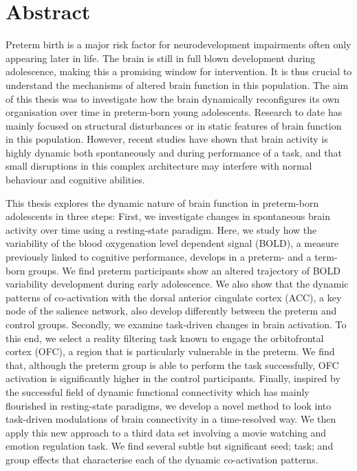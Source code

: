 

\cleardoublepage
\chapter*{Abstract}





Preterm birth is a major risk factor for neurodevelopment impairments often only appearing later in life. The brain is still in full blown development during adolescence, making this a promising window for intervention. It is thus crucial to understand the mechanisms of altered brain function in this population. The aim of this thesis was to investigate how the brain dynamically reconfigures its own organisation over time in preterm-born young adolescents. Research to date has mainly focused on structural disturbances or in static features of brain function in this population. However, recent studies have shown that brain activity is highly dynamic both spontaneously and during performance of a task, and that small disruptions in this complex architecture may interfere with normal behaviour and cognitive abilities.   


\hspace{1cm} This thesis explores the dynamic nature of brain function in preterm-born adolescents in three steps: First, we investigate changes in spontaneous brain activity over time using a resting-state paradigm. Here, we study how the variability of the blood oxygenation level dependent signal (BOLD), a measure previously linked to cognitive performance, develops in a preterm- and a term-born groups. We find preterm participants show an altered trajectory of BOLD variability development during early adolescence. We also show that the dynamic patterns of co-activation with the dorsal anterior cingulate cortex (ACC), a key node of the salience network, also develop differently between the preterm and control groups. Secondly, we examine task-driven changes in brain activation. To this end, we select a reality filtering task known to engage the orbitofrontal cortex (OFC), a region that is particularly vulnerable in the preterm. We find that, although the preterm group is able to perform the task successfully, OFC activation is significantly higher in the control participants. Finally, inspired by the successful field of dynamic functional connectivity which has mainly flourished in resting-state paradigms, we develop a novel method to look into task-driven modulations of brain connectivity in a time-resolved way. We then apply this new approach to a third data set involving a movie watching and emotion regulation task. We find several subtle but significant seed; task; and group effects that characterise each of the dynamic co-activation patterns.  

